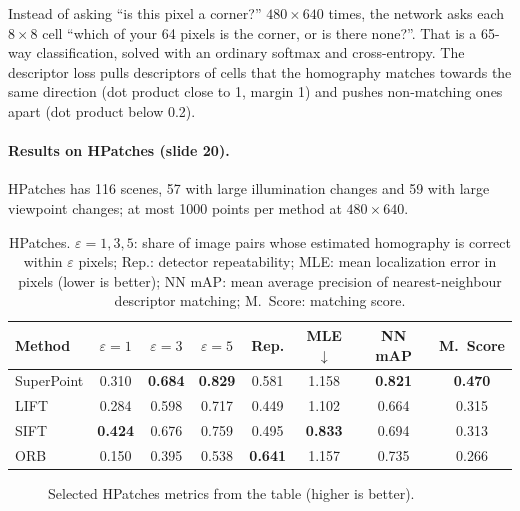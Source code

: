 \documentclass[11pt,a4paper]{article}
\begin{document}
\begin{intuition}
Instead of asking ``is this pixel a corner?'' $480\times640$ times, the network asks each $8\times8$ cell ``which of your 64 pixels is the corner,
or is there none?''. That is a 65-way classification, solved with an ordinary softmax and cross-entropy. The descriptor loss pulls
descriptors of cells that the homography matches towards the same direction (dot product close to 1, margin 1) and pushes non-matching ones
apart (dot product below 0.2).
\end{intuition}

\paragraph{Results on HPatches (slide 20).} HPatches has 116 scenes, 57 with large illumination changes and 59 with large viewpoint changes; at most 1000 points
per method at $480\times640$.

\begin{table}[H]
\centering
\begin{tabular}{lccccccc}
\toprule
Method & $\varepsilon{=}1$ & $\varepsilon{=}3$ & $\varepsilon{=}5$ & Rep. & MLE$\downarrow$ & NN mAP & M.\ Score\\
\midrule
SuperPoint & 0.310 & \textbf{0.684} & \textbf{0.829} & 0.581 & 1.158 & \textbf{0.821} & \textbf{0.470}\\
LIFT & 0.284 & 0.598 & 0.717 & 0.449 & 1.102 & 0.664 & 0.315\\
SIFT & \textbf{0.424} & 0.676 & 0.759 & 0.495 & \textbf{0.833} & 0.694 & 0.313\\
ORB & 0.150 & 0.395 & 0.538 & \textbf{0.641} & 1.157 & 0.735 & 0.266\\
\bottomrule
\end{tabular}
\caption{HPatches. $\varepsilon{=}1,3,5$: share of image pairs whose estimated homography is correct within $\varepsilon$ pixels; Rep.: detector repeatability; MLE: mean
localization error in pixels (lower is better); NN mAP: mean average precision of nearest-neighbour descriptor matching; M.\ Score: matching score.}
\end{table}

\begin{figure}[H]
\centering
{}
\caption{Selected HPatches metrics from the table (higher is better).}
\end{figure}
\end{document}

